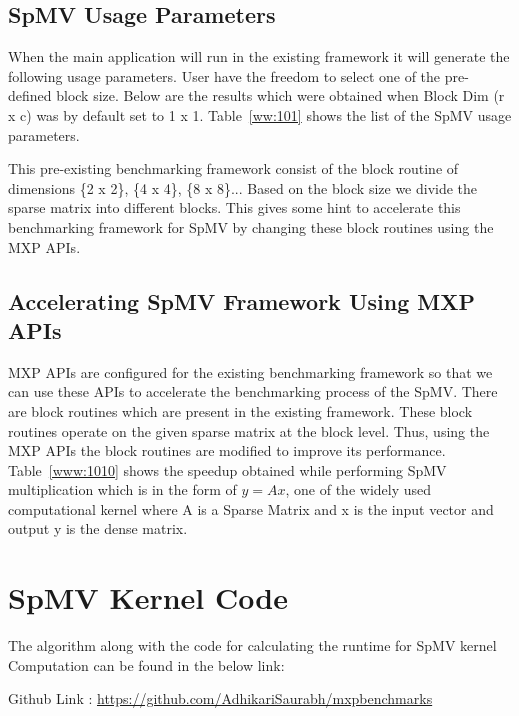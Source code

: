 \subsection{SpMV Usage Parameters}

When the main application will run in the existing framework it will generate the following usage parameters. User have the freedom to select one of the pre-defined block size. Below are the results which were obtained when Block Dim (r x c) was by default set to 1 x 1. Table~\ref{ww:101} shows the list of the SpMV usage parameters.





This pre-existing benchmarking framework consist of the block routine of dimensions \{2 x 2\}, \{4 x 4\}, \{8 x 8\}... Based on the block size we divide the sparse matrix into different blocks. This gives some hint to accelerate this benchmarking framework for SpMV by changing these block routines using the MXP APIs.


\subsection{Accelerating SpMV Framework Using MXP APIs}

MXP APIs are configured for the existing benchmarking framework so that we can use these APIs to accelerate the benchmarking process of the SpMV. There are block routines which are present in the existing framework. These block routines operate on the given sparse matrix at the block level. Thus, using the MXP APIs the block routines are modified to improve its performance.  Table~\ref{www:1010} shows the speedup obtained while performing SpMV multiplication which is in the form of $y = Ax$, one of the widely used computational kernel where A is a Sparse Matrix and x is the input vector and output y is the dense matrix.




\section{SpMV Kernel Code}

The algorithm along with the code for calculating the runtime for SpMV kernel Computation can be found in the below link:

Github Link : \url{https://github.com/AdhikariSaurabh/mxpbenchmarks}






